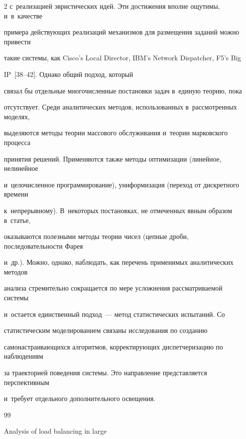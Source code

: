 \begin{multicols}{2}
с~реализацией эвристических идей. Эти достижения вполне ощутимы, и~в~качестве 


примера действующих реализаций механизмов для размещения заданий можно привести 


такие системы, как Cisco's Local Director, IBM's Network Dispatcher, F5's Big 


    IP~[38--42]. Однако общий подход, который 


связал бы отдельные многочисленные постановки задач в~единую теорию, пока 


отсутствует. Среди аналитических методов, использованных в~рассмотренных моделях, 


выделяются методы теории массового обслуживания и~теории марковского процесса 


принятия решений. Применяются также методы оптимизации (линейное, нелинейное 


и~целочисленное программирование), униформизация (переход от дискретного времени 


к~непрерывному). В~некоторых постановках, не отмеченных явным образом в~статье, 


оказываются полезными методы теории чисел (цепные дроби, последовательности Фарея 


и~др.). Можно, однако, наблюдать, как перечень применимых аналитических методов 


анализа стремительно сокращается по мере усложнения рассматриваемой системы 


и~остается единственный подход~--- метод статистических испытаний. Со 


статистическим моделированием связаны исследования по созданию 


самонастраивающихся алгоритмов, корректирующих диспетчеризацию по наблюдениям 


за траекторией поведения системы. Это направление представляется перспективным 


и~требует отдельного дополнительного освещения.





{\small\frenchspacing


 {%




 \begin{thebibliography}{99}




     Analysis of load balancing in large 



\end{thebibliography}}}
\end{multicols}
